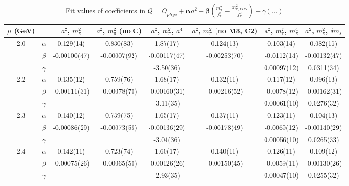 \documentclass[12pt]{extarticle}
\begin{document}
\begin{table}[h!]
\begin{center}
\begin{tabular}{|c c|c|c|c|c|c|c|}
\hline
$\mu$ (GeV) &  & $a^2$, $m_\pi^2$& $a^2$, $m_\pi^2$ (no C)& $a^2$, $m_\pi^2$, $a^4$& $a^2$, $m_\pi^2$ (no M3, C2)& $a^2$, $m_\pi^2$, $m_\pi^4$& $a^2$, $m_\pi^2$, $\delta m_s$\\
\hline
\multirow{3}{0.5in}{2.0} & $\alpha$ & 0.129(14)& 0.830(83)& 1.87(17)& 0.124(13)& 0.103(14)& 0.082(16)\\
 & $\beta$ & -0.00100(47)& -0.00007(92)& -0.00117(47)& -0.00253(70)& -0.0112(14)& -0.00132(47)\\
 & $\gamma$ &  &  & -3.50(36)&  & 0.00097(12)& 0.0311(34)\\
\hline
\multirow{3}{0.5in}{2.2} & $\alpha$ & 0.135(12)& 0.759(76)& 1.68(17)& 0.132(11)& 0.117(12)& 0.096(13)\\
 & $\beta$ & -0.00111(31)& -0.00078(70)& -0.00160(31)& -0.00216(52)& -0.0078(12)& -0.00162(31)\\
 & $\gamma$ &  &  & -3.11(35)&  & 0.00061(10)& 0.0276(32)\\
\hline
\multirow{3}{0.5in}{2.3} & $\alpha$ & 0.140(12)& 0.739(75)& 1.65(17)& 0.137(11)& 0.123(11)& 0.104(13)\\
 & $\beta$ & -0.00086(29)& -0.00073(58)& -0.00136(29)& -0.00178(49)& -0.0069(12)& -0.00140(29)\\
 & $\gamma$ &  &  & -3.04(36)&  & 0.00056(10)& 0.0265(33)\\
\hline
\multirow{3}{0.5in}{2.4} & $\alpha$ & 0.142(11)& 0.723(74)& 1.60(17)& 0.140(11)& 0.126(11)& 0.109(12)\\
 & $\beta$ & -0.00075(26)& -0.00065(50)& -0.00126(26)& -0.00150(45)& -0.0059(11)& -0.00130(26)\\
 & $\gamma$ &  &  & -2.93(35)&  & 0.00047(10)& 0.0255(32)\\
\hline
\end{tabular}
\caption{Fit values of coefficients in $Q = Q_{phys} + \mathbf{\alpha} a^2 + \mathbf{\beta}\left(\frac{m_\pi^2}{f_\pi^2}-\frac{m_{\pi,PDG}^2}{f_\pi^2}\right) + \gamma(\ldots)$}
\end{center}
\end{table}






\end{document}
